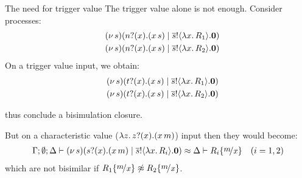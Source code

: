 \documentclass{beamer}
\begin{document}
	\begin{frame}{The need for trigger value}
		The trigger value alone is not enough.
		Consider processes:
		\begin{eqnarray*}
			&&(\nu\, s)(n ? (x) . (x\, {s}) \;|\; \overline{s} ! \langle \lambda x.\,R_1 \rangle . \mathbf{0}) \\
			&&(\nu\, s)(n ? (x) . (x\, {s}) \;|\; \overline{s} ! \langle \lambda x.\,R_2 \rangle . \mathbf{0}) 
		\end{eqnarray*}
		On a trigger value input, we obtain:
		\begin{eqnarray*}
			&&(\nu\, s)(t ? (x) . (x\, {s}) \;|\; \overline{s} ! \langle \lambda x.\,R_1 \rangle . \mathbf{0}) \\
			&&(\nu\, s)(t ? (x) . (x\, {s}) \;|\; \overline{s} ! \langle \lambda x.\,R_2 \rangle . \mathbf{0})
		\end{eqnarray*}

		\noi thus conclude a bisimulation closure.

		But
		on a characteristic value ($\lambda z.\,z ? (x) . (x\, {m})$) input 
		then they would become:
		\begin{eqnarray*}
			\Gamma; \es; \Delta \proves \newsp{s}{\binp{s}{x} (\appl{x}{m}) \Par \bout{\dual{s}}{\abs{x} R_i} \inact} \wbc \Delta \proves R_i \subst{m}{x}
		\quad (i=1,2)
		\end{eqnarray*}
		\noi which are not bisimilar if $R_1 \subst{m}{x} \not\wbc R_2 \subst{m}{x}$.
	\end{frame}
\end{document}
